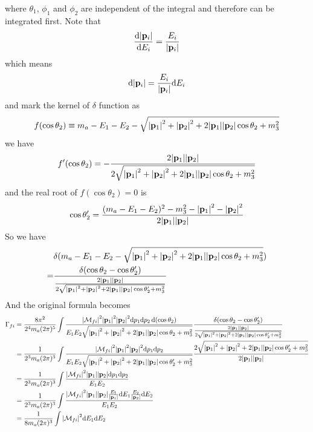 \documentclass{article}
\newcommand{\apo}{\abs{\vb{p}_1}}
\newcommand{\aps}{\abs{\vb{p}_2}}
\begin{document}
where $\theta_1$, $\phi_1$ and $\phi_2$ are independent of the integral and therefore can be integrated first. Note that
\begin{align*}
  \frac{\dd \abs{\vb{p}_i}}{\dd E_i}=\frac{E_i}{\abs{\vb{p}_i}}
\end{align*}
which means
\begin{align*}
  \dd \abs{\vb{p}_i}=\frac{E_i}{\abs{\vb{p}_i}}\dd E_i
\end{align*}
and mark the kernel of $\delta$ function as
\begin{align*}
  f(\cos\theta_2)\equiv m_a-E_1-E_2-\sqrt{\abs{\vb{p}_1}^2+\abs{\vb{p}_2}^2+2\abs{\vb{p}_1}\abs{\vb{p}_2}\cos\theta_2+m_3^2}
\end{align*}
we have
\begin{align*}
  f'(\cos\theta_2)=-\frac{2\apo\aps}{2\sqrt{\apo^2+\aps^2+2\apo\aps\cos\theta_2+m_3^2}}
\end{align*}
and the real root of $f(\cos\theta_2)=0$ is
\begin{align*}
  \cos\theta'_2=\frac{(m_a-E_1-E_2)^2-m_3^2-\apo^2-\aps^2}{2\apo\aps}
\end{align*}
So we have
\begin{align*}
  &\delta(m_a-E_1-E_2-\sqrt{\abs{\vb{p}_1}^2+\abs{\vb{p}_2}^2+2\abs{\vb{p}_1}\abs{\vb{p}_2}\cos\theta_2+m_3^2})\\
  =&\frac{\delta(\cos\theta_2-\cos\theta_2')}{\frac{2\apo\aps}{2\sqrt{\apo^2+\aps^2+2\apo\aps\cos\theta'_2+m_3^2}}}
\end{align*}
And the original formula becomes
\begin{align*}
  \Gamma_{fi}&=\frac{8\pi^2}{2^4m_a(2\pi)^5}\int\frac{\abs{\mathcal{M}_{fi}}^2\abs{\vb{p}_1}^2\abs{\vb{p}_2}^2\dd p_1\dd p_2\dd(\cos\theta_2)}{E_1E_2\sqrt{\abs{\vb{p}_1}^2+\abs{\vb{p}_2}^2+2\abs{\vb{p}_1}\abs{\vb{p}_2}\cos\theta_2+m_3^2}}\frac{\delta(\cos\theta_2-\cos\theta_2')}{\frac{2\apo\aps}{2\sqrt{\apo^2+\aps^2+2\apo\aps\cos\theta'_2+m_3^2}}}\\
  &=\frac{1}{2^3m_a(2\pi)^3}\int\frac{\abs{\mathcal{M}_{fi}}^2\abs{\vb{p}_1}^2\abs{\vb{p}_2}^2\dd p_1\dd p_2}{E_1E_2\sqrt{\abs{\vb{p}_1}^2+\abs{\vb{p}_2}^2+2\abs{\vb{p}_1}\abs{\vb{p}_2}\cos\theta'_2+m_3^2}}\frac{2\sqrt{\apo^2+\aps^2+2\apo\aps\cos\theta'_2+m_3^2}}{2\apo\aps}\\
  &=\frac{1}{2^3m_a(2\pi)^3}\int\frac{\abs{\mathcal{M}_{fi}}^2\abs{\vb{p}_1}\abs{\vb{p}_2}\dd p_1\dd p_2}{E_1E_2}\\
  &=\frac{1}{2^3m_a(2\pi)^3}\int\frac{\abs{\mathcal{M}_{fi}}^2\abs{\vb{p}_1}\abs{\vb{p}_2}\frac{E_1}{\abs{\vb{p}_1}}\dd E_1\frac{E_2}{\abs{\vb{p}_2}}\dd E_2}{E_1E_2}\\
  &=\frac{1}{8m_a(2\pi)^3}\int\abs{\mathcal{M}_{fi}}^2\dd E_1\dd E_2
\end{align*}
\end{document}
